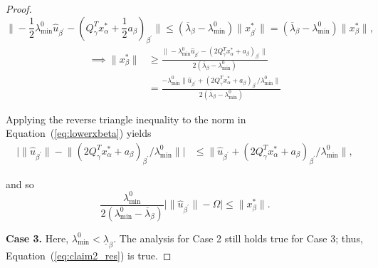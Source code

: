 \documentclass[]{article}
\begin{document}
\begin{proof}
        \[\|-\frac{1}{2}\lambda_{\min}^0\hat{u}_{\beta^\prime}-(Q_\gamma^T x_\alpha^* + \frac{1}{2}a_{\beta})_{\beta^\prime}\| \leq (\overline{\lambda}_\beta -\lambda_{\min}^0)\|x_{\beta^\prime}^*\| = (\overline{\lambda}_\beta -\lambda_{\min}^0)\|x_\beta^*\|,\]
        \begin{equation}\label{eq:lowerxbeta}
            \begin{aligned}
                \implies \|x_\beta^*\|&\geq \frac{\|-\lambda_{\min}^0\hat{u}_{\beta^\prime}-(2Q_\gamma^T x_\alpha^* + a_{\beta})_{\beta^\prime}\|}{2(\overline{\lambda}_\beta - \lambda_{\min}^0)}\\
                &=\frac{-\lambda_{\min}^0\|\hat{u}_{\beta^\prime} + (2Q_\gamma^T x_\alpha^* + a_{\beta})_{\beta^\prime}/\lambda_{\min}^0\|}{2(\overline{\lambda}_\beta - \lambda_{\min}^0)}
            \end{aligned}
        \end{equation}

        Applying the reverse triangle inequality to the norm in Equation~(\ref{eq:lowerxbeta}) yields 
        \begin{equation}\label{eq:ubeta_range}
            \begin{aligned}
                \bigl| \|\hat{u}_{\beta^\prime}\| 
                 - \bigl\|(2Q_\gamma^T x_\alpha^* + a_{\beta})_{\beta^\prime}/\lambda_{\min}^0\bigr\| \bigr|
                &\leq \bigl\|\hat{u}_{\beta^\prime} + (2Q_\gamma^T x_\alpha^* + a_{\beta})_{\beta^\prime}/\lambda_{\min}^0\bigr\|,
            \end{aligned}
        \end{equation}
        
        
        and so
        \begin{equation}\label{eq:claim2_res}
            \frac{\lambda_{\min}^0}{2(\lambda_{\min}^0 - \overline{\lambda}_\beta)}\bigl| \|\hat{u}_{\beta^\prime}\| 
                 - \Omega \bigr| \leq \|x_\beta^*\|.
        \end{equation}

        \textbf{Case 3.} Here, $\lambda_{\min}^0 < \underline{\lambda}_\beta$. The analysis for Case 2 still holds true for Case 3; thus, Equation~(\ref{eq:claim2_res}) is true. 
        

\end{proof}
\end{document}

